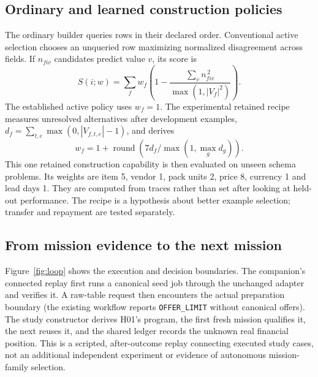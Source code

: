 \documentclass[11pt,letterpaper]{article}
\newcommand{\code}[1]{\texttt{\small #1}}
\begin{document}
\subsection{Ordinary and learned construction policies}

The ordinary builder queries rows in their declared order. Conventional active selection chooses an unqueried row maximizing normalized disagreement across fields. If $n_{fiv}$ candidates predict value $v$, its score is
\begin{equation}
 S(i;w)=\sum_f w_f\left(1-\frac{\sum_v n_{fiv}^{\,2}}{\max(1,|V_f|^2)}\right).
\label{eq:selection}
\end{equation}
The established active policy uses $w_f=1$. The experimental retained recipe measures unresolved alternatives after development examples, $d_f=\sum_{t,e}\max(0,|V_{f,t,e}|-1)$, and derives
\begin{equation}
 w_f=1+\operatorname{round}\left(7d_f/\max(1,\max_g d_g)\right).
\end{equation}
This one retained construction capability is then evaluated on unseen schema problems. Its weights are item 5, vendor 1, pack units 2, price 8, currency 1 and lead days 1. They are computed from traces rather than set after looking at held-out performance. The recipe is a hypothesis about better example selection; transfer and repayment are tested separately.

\subsection{From mission evidence to the next mission}

Figure~\ref{fig:loop} shows the execution and decision boundaries. The companion's connected replay first runs a canonical seed job through the unchanged adapter and verifies it. A raw-table request then encounters the actual preparation boundary (the existing workflow reports \code{OFFER\_LIMIT} without canonical offers). The study constructor derives H01's program, the first fresh mission qualifies it, the next reuses it, and the shared ledger records the unknown real financial position. This is a scripted, after-outcome replay connecting executed study cases, not an additional independent experiment or evidence of autonomous mission-family selection.
\end{document}
